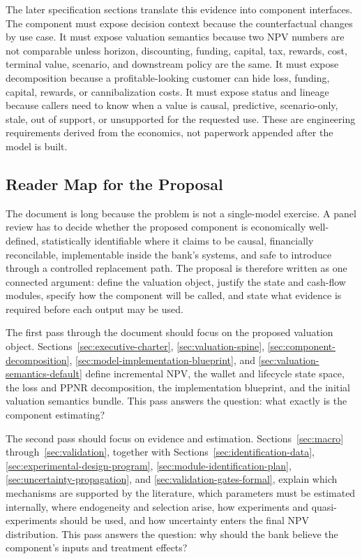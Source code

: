 \documentclass[11pt]{article}
\newcommand{\1}{\mathbf{1}}
\begin{document}
The later specification sections translate this evidence into component
interfaces. The component must expose decision context because the
counterfactual changes by use case. It must expose valuation semantics because
two NPV numbers are not comparable unless horizon, discounting, funding,
capital, tax, rewards, cost, terminal value, scenario, and downstream policy are
the same. It must expose decomposition because a profitable-looking customer
can hide loss, funding, capital, rewards, or cannibalization costs. It must
expose status and lineage because callers need to know when a value is causal,
predictive, scenario-only, stale, out of support, or unsupported for the
requested use. These are engineering requirements derived from the economics,
not paperwork appended after the model is built.

\subsection{Reader Map for the Proposal}
\label{sec:how-to-read}

The document is long because the problem is not a single-model exercise. A
panel review has to decide whether the proposed component is economically
well-defined, statistically identifiable where it claims to be causal,
financially reconcilable, implementable inside the bank's systems, and safe to
introduce through a controlled replacement path. The proposal is therefore
written as one connected argument: define the valuation object, justify the
state and cash-flow modules, specify how the component will be called, and state
what evidence is required before each output may be used.

The first pass through the document should focus on the proposed valuation
object. Sections~\ref{sec:executive-charter}, \ref{sec:valuation-spine},
\ref{sec:component-decomposition}, \ref{sec:model-implementation-blueprint},
and \ref{sec:valuation-semantics-default} define incremental NPV, the wallet
and lifecycle state space, the loss and PPNR decomposition, the implementation
blueprint, and the initial valuation semantics bundle. This pass answers the
question: what exactly is the component estimating?

The second pass should focus on evidence and estimation. Sections~\ref{sec:macro}
through~\ref{sec:validation}, together with
Sections~\ref{sec:identification-data},
\ref{sec:experimental-design-program},
\ref{sec:module-identification-plan}, \ref{sec:uncertainty-propagation}, and
\ref{sec:validation-gates-formal}, explain which mechanisms are supported by
the literature, which parameters must be estimated internally, where
endogeneity and selection arise, how experiments and quasi-experiments should
be used, and how uncertainty enters the final NPV distribution. This pass
answers the question: why should the bank believe the component's inputs and
treatment effects?
\end{document}
